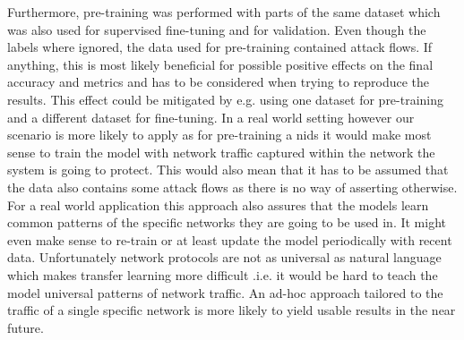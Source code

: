 Furthermore, pre-training was performed with parts of the same dataset which was also used for supervised fine-tuning and for validation. Even though the labels where ignored, the data used for pre-training contained attack flows. If anything, this is most likely beneficial for possible positive effects on the final accuracy and metrics and has to be considered when trying to reproduce the results. This effect could be mitigated by e.g. using one dataset for pre-training and a different dataset for fine-tuning. In a real world setting however our scenario is more likely to apply as for pre-training a \gls{nids} it would make most sense to train the model with network traffic captured within the network the system is going to protect. This would also mean that it has to be assumed that the data also contains some attack flows as there is no way of asserting otherwise. For a real world application this approach also assures that the models learn common patterns of the specific networks they are going to be used in. It might even make sense to re-train or at least update the model periodically with recent data. Unfortunately network protocols are not as universal as natural language which makes transfer learning more difficult .i.e. it would be hard to teach the model universal patterns of network traffic. An ad-hoc approach tailored to the traffic of a single specific network is more likely to yield usable results in the near future. \par

